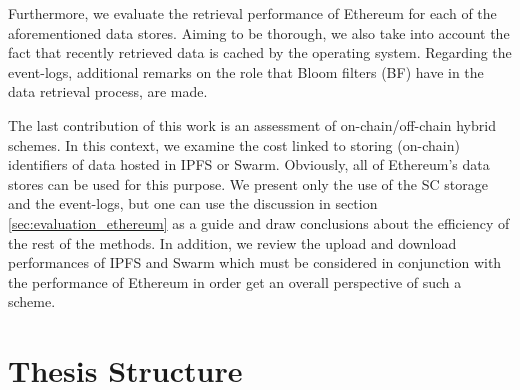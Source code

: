 Furthermore, we evaluate the retrieval performance of Ethereum for each of the aforementioned data stores. Aiming to be thorough, we also take into account the fact that recently retrieved data is cached by the operating system. Regarding the event-logs, additional remarks on the role that Bloom filters (BF) have in the data retrieval process, are made.

The last contribution of this work is an assessment of on-chain/off-chain hybrid schemes. In this context, we examine the cost linked to storing (on-chain) identifiers of data hosted in IPFS or Swarm. Obviously, all of Ethereum's data stores can be used for this purpose. We present only the use of the SC storage and the event-logs, but one can use the discussion in section \ref{sec:evaluation_ethereum} as a guide and draw conclusions about the efficiency of the rest of the methods. In addition, we review the upload and download performances of IPFS and Swarm which must be considered in conjunction with the performance of Ethereum in order get an overall perspective of such a scheme. 

\section{Thesis Structure}\label{sec:organization}
